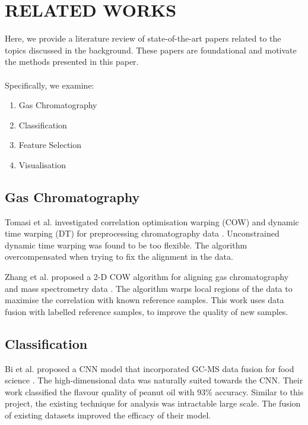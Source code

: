 \documentclass{article}
\begin{document}
\section{RELATED WORKS}
\label{sec:related-works}

Here, we provide a literature review of state-of-the-art papers related to the topics discussed in the background. These papers are foundational and motivate the methods presented in this paper.
\\\\
Specifically, we examine:

\begin{enumerate}
  \item Gas Chromatography
  \item Classification
  \item Feature Selection
  \item Visualisation
\end{enumerate}

\subsection{Gas Chromatography}
\label{sec:related-gas-chromatography}

Tomasi et al. investigated correlation optimisation warping (COW) and dynamic time warping (DT) for preprocessing chromatography data \cite{tomasi2004correlation}.
Unconstrained dynamic time warping was found to be too flexible.
The algorithm overcompensated when trying to fix the alignment in the data.

Zhang et al. proposed a 2-D COW algorithm for aligning gas chromatography and mass spectrometry data \cite{zhang2008two}.
The algorithm warps local regions of the data to maximise the correlation with known reference samples.
This work uses data fusion with labelled reference samples, to improve the quality of new samples.

\subsection{Classification}
\label{sec:related-classification}

Bi et al. proposed a CNN model that incorporated GC-MS data fusion for food science \cite{bi2020gc}.
The high-dimensional data was naturally suited towards the CNN.
Their work classified the flavour quality of peanut oil with 93\% accuracy.
Similar to this project, the existing technique for analysis was intractable large scale.
The fusion of existing datasets improved the efficacy of their model.
\end{document}
